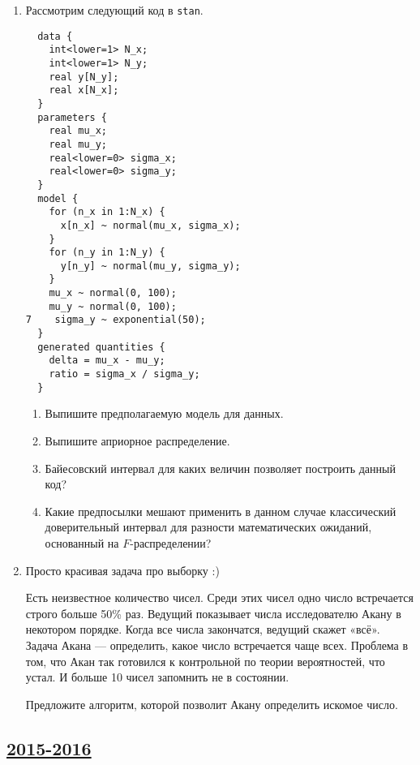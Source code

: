 \begin{enumerate}
\newpage
\item Рассмотрим следующий код в \verb|stan|.

  \begin{verbatim}
  data {
    int<lower=1> N_x;
    int<lower=1> N_y;
    real y[N_y];
    real x[N_x];
  }
  parameters {
    real mu_x;
    real mu_y;
    real<lower=0> sigma_x;
    real<lower=0> sigma_y;
  }
  model {
    for (n_x in 1:N_x) {
      x[n_x] ~ normal(mu_x, sigma_x);
    }
    for (n_y in 1:N_y) {
      y[n_y] ~ normal(mu_y, sigma_y);
    }
    mu_x ~ normal(0, 100);
    mu_y ~ normal(0, 100);
7    sigma_y ~ exponential(50);
  }
  generated quantities {
    delta = mu_x - mu_y;
    ratio = sigma_x / sigma_y;
  }
  \end{verbatim}

\begin{enumerate}
\item Выпишите предполагаемую модель для данных.
\item Выпишите априорное распределение.
\item Байесовский интервал для каких величин позволяет построить данный код?
\item Какие предпосылки мешают применить в данном случае классический доверительный
интервал для разности математических ожиданий, основанный на $F$-распределении?
\end{enumerate}

\item Просто красивая задача про выборку :)

Есть неизвестное количество чисел. Среди этих чисел одно число встречается строго
больше 50\% раз. Ведущий показывает числа исследователю Акану в некотором порядке.
Когда все числа закончатся, ведущий скажет «всё». Задача Акана — определить, какое
число встречается чаще всех. Проблема в том, что Акан так готовился к контрольной
по теории вероятностей, что устал. И больше 10 чисел запомнить не в состоянии.

Предложите алгоритм, которой позволит Акану определить искомое число.
\end{enumerate}


\newpage
\subsection[2015-2016]{\hyperref[sec:sol_kr_03_ip_2015_2016]{2015-2016}}
\label{sec:kr_03_ip_2015_2016}

